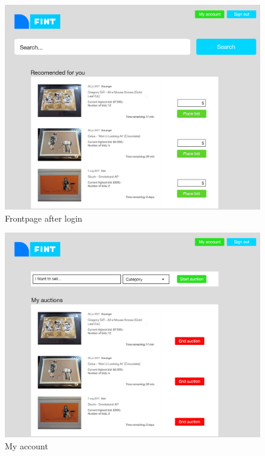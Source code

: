 \begin{figure}
	\caption{Frontpage after login}
	\centering
		\includegraphics[scale=0.38]{figures/Frontpage-after-login}
\end{figure}

\begin{figure}
	\caption{My account}
	\centering
		\includegraphics[scale=0.38]{figures/my-account}
\end{figure}

